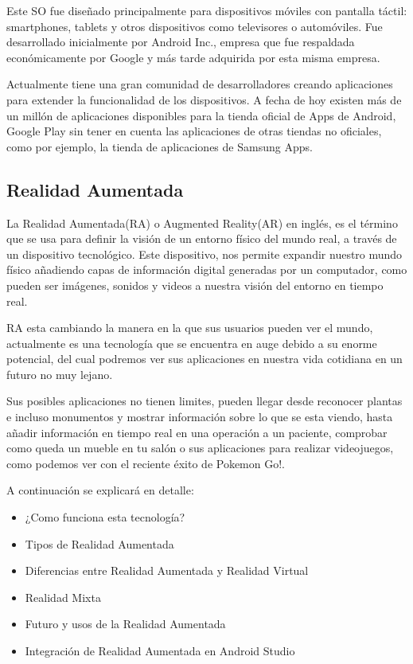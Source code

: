 Este SO fue diseñado principalmente para dispositivos móviles con pantalla táctil: smartphones, tablets y otros dispositivos como televisores o automóviles. Fue desarrollado inicialmente por Android Inc., empresa que fue respaldada económicamente por Google y más tarde adquirida por esta misma empresa.

Actualmente tiene una gran comunidad de desarrolladores creando aplicaciones para extender la funcionalidad de los dispositivos. A fecha de hoy existen más de un millón de aplicaciones disponibles para la tienda oficial de Apps de Android, Google Play\cite{URL::GooglePlay} sin tener en cuenta las aplicaciones de otras tiendas no oficiales, como por ejemplo, la tienda de aplicaciones de Samsung Apps\cite{URL::SamsungApps}. 

\subsection{Realidad Aumentada}

La Realidad Aumentada(RA) o Augmented Reality(AR) en inglés, es el término que se usa para definir la visión de un entorno físico del mundo real, a través de un dispositivo tecnológico. Este dispositivo, nos permite expandir nuestro mundo físico añadiendo capas de información digital generadas por un computador, como pueden ser imágenes, sonidos y videos a nuestra visión del entorno en tiempo real. 

RA esta cambiando la manera en la que sus usuarios pueden ver el mundo, actualmente es una tecnología que se encuentra en auge debido a su enorme potencial, del cual podremos ver sus aplicaciones en nuestra vida cotidiana en un futuro no muy lejano. 

Sus posibles aplicaciones no tienen limites, pueden llegar desde reconocer plantas e incluso monumentos y mostrar información sobre lo que se esta viendo, hasta añadir información en tiempo real en una operación a un paciente, comprobar como queda un mueble en tu salón o sus aplicaciones para realizar videojuegos, como podemos ver con el reciente éxito de Pokemon Go!. 

A continuación se explicará en detalle:
\begin{itemize}
\item ¿Como funciona esta tecnología?
\item Tipos de Realidad Aumentada
\item Diferencias entre Realidad Aumentada y Realidad Virtual
\item Realidad Mixta
\item Futuro y usos de la Realidad Aumentada
\item Integración de Realidad Aumentada en Android Studio
\end{itemize}  


